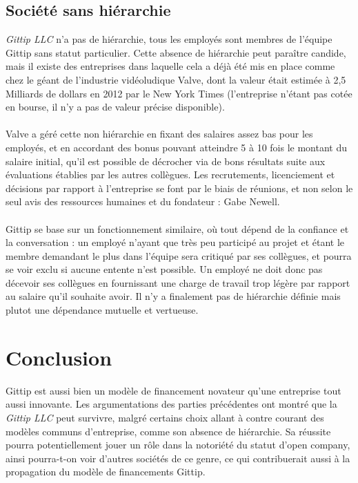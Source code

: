     \subsection{Société sans hiérarchie}

\emph{Gittip LLC} n'a pas de hiérarchie, tous les employés sont membres de
l'équipe Gittip sans statut particulier. Cette absence de hiérarchie peut
paraître candide, mais il existe des entreprises dans laquelle cela a déjà été
mis en place comme chez le géant de l'industrie vidéoludique Valve,
dont la valeur
était estimée à 2,5 Milliards de dollars en 2012 par le New York Times
(l'entreprise n'étant pas cotée en bourse, il n'y a pas de valeur précise
disponible).

\paragraph{}
Valve a géré cette non hiérarchie en fixant des salaires assez bas pour les
employés, et en accordant des bonus pouvant atteindre 5 à 10 fois le montant du
salaire initial, qu'il est possible de décrocher via de bons résultats suite
aux évaluations établies par les autres collègues. Les recrutements,
licenciement et décisions par rapport à l'entreprise se font par le biais de
réunions, et non selon le seul avis des ressources humaines et du fondateur :
Gabe Newell.

\paragraph{}
Gittip se base sur un fonctionnement similaire, où tout dépend de la
confiance et la conversation : un employé n'ayant que très peu participé au
projet et étant le membre demandant le plus dans l'équipe sera critiqué par ses
collègues, et pourra se voir exclu si aucune entente n'est possible. Un employé
ne doit donc pas décevoir ses collègues en fournissant une charge de travail
trop légère par rapport au salaire qu'il souhaite avoir. Il n'y a
finalement pas de hiérarchie définie mais plutot une dépendance mutuelle
et vertueuse.


    \section{Conclusion}

Gittip est aussi bien un modèle de financement novateur qu'une entreprise tout
aussi innovante. Les argumentations des parties précédentes ont montré que la
\emph{Gittip LLC} peut survivre, malgré certains choix allant à contre courant
des modèles communs d'entreprise, comme son absence de hiérarchie. Sa réussite
pourra potentiellement jouer un rôle dans la notoriété du statut d'open
company, ainsi pourra-t-on voir d'autres sociétés de ce genre, ce qui
contribuerait aussi à la propagation du modèle de financements Gittip.
